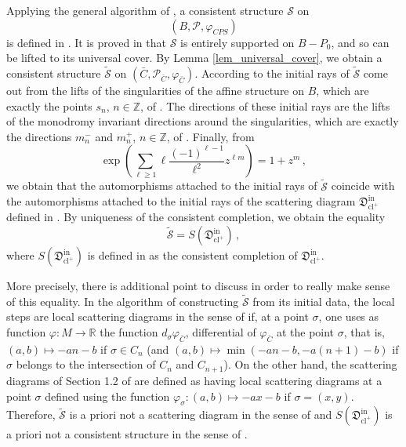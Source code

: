 \documentclass[11pt,letterpaper]{amsart}
\newcommand\R{\mathbb R}
\newcommand\Z{\mathbb Z}
\newcommand\fD{\mathfrak D}
\newcommand\cl{\operatorname{cl}}
\newcommand\iin{\mathrm{in}}
\begin{document}
Applying the general algorithm of
\cite{MR2846484, MR2722115},
a consistent structure $\mathcal{S}$ on 
\[(B,\mathscr{P},\varphi_{CPS})\] 
is defined in 
\cite{cps}. It is proved in 
\cite[\S 5]{gabele2019tropical} that $\mathcal{S}$ is entirely supported on $B-P_0$, and so can be lifted to its universal cover. 
By Lemma \ref{lem_universal_cover}, we obtain a consistent structure $\tilde{\mathcal{S}}$ on $(\bar{C}, \mathscr{P}_{\bar{C}},\varphi_{\bar{C}})$. 
According to \cite[Definition 5.10]{gabele2019tropical}
the initial rays of
$\tilde{\mathcal{S}}$ come out from the lifts of the singularities of the affine structure on $B$, which are exactly the points $s_n$,
$n \in \Z$, of \cite[\S 1.3]{bousseau2019scattering}. The directions of these initial rays are the lifts of the monodromy invariant directions around the singularities, which are exactly the directions $m_n^-$ and $m_n^+$, $n \in \Z$, of \cite[\S 1.3]{bousseau2019scattering}.
Finally, from 
\[ \exp \left( \sum_{\ell \geqslant 1}
\ell \frac{(-1)^{\ell-1}}{\ell^2}z^{\ell m}
\right)=1+z^m\,,\]
we obtain that the automorphisms attached to the initial rays of $\tilde{\mathcal{S}}$ coincide with the automorphisms attached to the initial rays of the scattering diagram $\fD^\iin_{\cl^+}$
defined in \cite[\S 1.4]{bousseau2019scattering}.
By uniqueness of the consistent completion, we obtain the equality
\[ \tilde{\mathcal{S}}=S(\fD^\iin_{\cl^+})\,,\]
where $S(\fD^\iin_{\cl^+})$ is defined in
\cite{bousseau2019scattering} as the consistent completion of $\fD^\iin_{\cl^+}$.

More precisely, there is additional point to discuss in order to really make sense of this equality. In the algorithm of
\cite{MR2846484} constructing $\tilde{\mathcal{S}}$ from its initial data, the local steps are local scattering diagrams in the sense of \cite[\S 1.1]{bousseau2019scattering} if, at a point $\sigma$, one uses as function $\varphi \colon M \rightarrow \R$ the function $d_\sigma \varphi_{\bar{C}}$,
differential of $\varphi_{\bar{C}}$ at the point $\sigma$, that is, $(a,b) \mapsto -an-b$ if $\sigma \in 
C_n$ (and $(a,b) \mapsto \min(-an-b,-a(n+1)-b)$ if $\sigma$ belongs to the intersection of $C_n$ and $C_{n+1}$).
On the other hand, the scattering diagrams of Section 1.2 of
\cite{bousseau2019scattering} are defined as having local scattering diagrams at a point $\sigma$ defined using the function $\varphi_\sigma \colon (a,b) \mapsto -ax-b$ if $\sigma=(x,y)$. 
Therefore, $\tilde{\mathcal{S}}$ is a priori not a scattering diagram in the sense of \cite[\S 1.2]{bousseau2019scattering} and $S(\fD_{\cl^+}^\iin)$ is a priori not a consistent structure in the sense of \cite{MR2846484}. 
\end{document}
